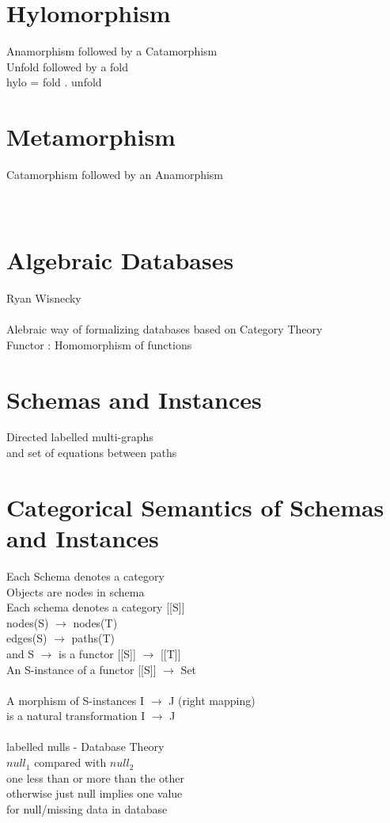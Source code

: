 \documentclass{article}
\begin{document}
\section{Hylomorphism}
Anamorphism followed by a Catamorphism
\\
Unfold followed by a fold
\\
hylo = fold . unfold
\\
\section{Metamorphism}
Catamorphism followed by an Anamorphism
\\
\\
\\
\section{Algebraic Databases}
Ryan Wisnecky
\\
\\
Alebraic way of formalizing databases based on Category Theory
\\
Functor : Homomorphism of functions
\\
\section{Schemas and Instances}
Directed labelled multi-graphs 
\\
and set of equations between paths
\\
\section{Categorical Semantics of Schemas and Instances}
Each Schema denotes a category
\\
Objects are nodes in schema
\\
Each schema denotes a category [[S]]
\\
nodes(S) $\rightarrow$ nodes(T)
\\
edges(S) $\rightarrow$ paths(T)
\\
and S $\rightarrow$ is a functor [[S]] $\rightarrow$ [[T]]
\\
An S-instance of a functor [[S]] $\rightarrow$  Set
\\
\\
A morphism of S-instances I $\rightarrow$ J (right mapping) 
\\
is a natural transformation I $\rightarrow$ J
\\
\\
labelled nulls - Database Theory
\\
$null_{1}$ compared with $null_{2}$
\\
one less than or more than the other
\\
otherwise just null implies one value
\\
for null/missing data in database
\\
\end{document}
